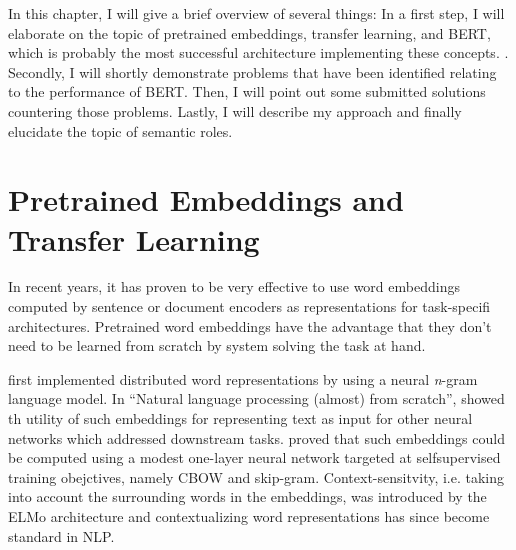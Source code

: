 \label{chap:2_approach}



In this chapter, I will give a brief overview of several things: In a first step, I
will elaborate on the topic of pretrained embeddings, transfer learning, and BERT,
which is probably the most successful architecture implementing these concepts. .
Secondly, I will shortly demonstrate problems that have been identified relating to
the performance of BERT. Then, I will point out some submitted solutions countering
those problems. Lastly, I will describe my approach and finally elucidate the topic of
semantic roles.



\section{Pretrained Embeddings and Transfer Learning}
\label{sec:pretrained-embeddings}

In recent years, it has proven to be very effective to use word embeddings computed by
sentence or document encoders as representations for task-specifi architectures. Pretrained
word embeddings have the advantage that they don't need to be learned from scratch by system
solving the task at hand.

\cite{bengio2003neural} first implemented distributed word representations by using
a neural \textit{n}-gram language model. In ``Natural language processing (almost)
from scratch'', \cite{collobert2011natural} showed th utility of such embeddings for
representing text as input for other neural networks which addressed downstream tasks.
\cite{mikolov2013distributed} proved that such embeddings could be computed using a
modest one-layer neural network targeted at selfsupervised training obejctives, namely
CBOW and skip-gram. Context-sensitvity, i.e. taking into account the surrounding words
in the embeddings, was introduced by the ELMo architecture \cite{peng2019transfer} and
contextualizing word representations has since become standard in NLP.



